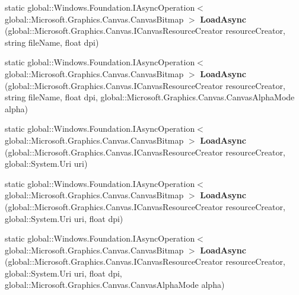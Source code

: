 \begin{DoxyCompactItemize}
\item 
\mbox{\label{class_microsoft_1_1_graphics_1_1_canvas_1_1_canvas_bitmap_ab43fae45180aa4d2fad4cd9b9426416e}} 
static global\+::\+Windows.\+Foundation.\+I\+Async\+Operation$<$ global\+::\+Microsoft.\+Graphics.\+Canvas.\+Canvas\+Bitmap $>$ {\bfseries Load\+Async} (global\+::\+Microsoft.\+Graphics.\+Canvas.\+I\+Canvas\+Resource\+Creator resource\+Creator, string file\+Name, float dpi)
\item 
\mbox{\label{class_microsoft_1_1_graphics_1_1_canvas_1_1_canvas_bitmap_afef79684594ac3ba07cf8cf01939165c}} 
static global\+::\+Windows.\+Foundation.\+I\+Async\+Operation$<$ global\+::\+Microsoft.\+Graphics.\+Canvas.\+Canvas\+Bitmap $>$ {\bfseries Load\+Async} (global\+::\+Microsoft.\+Graphics.\+Canvas.\+I\+Canvas\+Resource\+Creator resource\+Creator, string file\+Name, float dpi, global\+::\+Microsoft.\+Graphics.\+Canvas.\+Canvas\+Alpha\+Mode alpha)
\item 
\mbox{\label{class_microsoft_1_1_graphics_1_1_canvas_1_1_canvas_bitmap_a29af06676a85a4ad0adfc9e766d96ae1}} 
static global\+::\+Windows.\+Foundation.\+I\+Async\+Operation$<$ global\+::\+Microsoft.\+Graphics.\+Canvas.\+Canvas\+Bitmap $>$ {\bfseries Load\+Async} (global\+::\+Microsoft.\+Graphics.\+Canvas.\+I\+Canvas\+Resource\+Creator resource\+Creator, global\+::\+System.\+Uri uri)
\item 
\mbox{\label{class_microsoft_1_1_graphics_1_1_canvas_1_1_canvas_bitmap_a18f1f34916c8b70dc7ff8d8044e0ba43}} 
static global\+::\+Windows.\+Foundation.\+I\+Async\+Operation$<$ global\+::\+Microsoft.\+Graphics.\+Canvas.\+Canvas\+Bitmap $>$ {\bfseries Load\+Async} (global\+::\+Microsoft.\+Graphics.\+Canvas.\+I\+Canvas\+Resource\+Creator resource\+Creator, global\+::\+System.\+Uri uri, float dpi)
\item 
\mbox{\label{class_microsoft_1_1_graphics_1_1_canvas_1_1_canvas_bitmap_aeebce5625f77585197137344e96fb39d}} 
static global\+::\+Windows.\+Foundation.\+I\+Async\+Operation$<$ global\+::\+Microsoft.\+Graphics.\+Canvas.\+Canvas\+Bitmap $>$ {\bfseries Load\+Async} (global\+::\+Microsoft.\+Graphics.\+Canvas.\+I\+Canvas\+Resource\+Creator resource\+Creator, global\+::\+System.\+Uri uri, float dpi, global\+::\+Microsoft.\+Graphics.\+Canvas.\+Canvas\+Alpha\+Mode alpha)

\end{DoxyCompactItemize}
